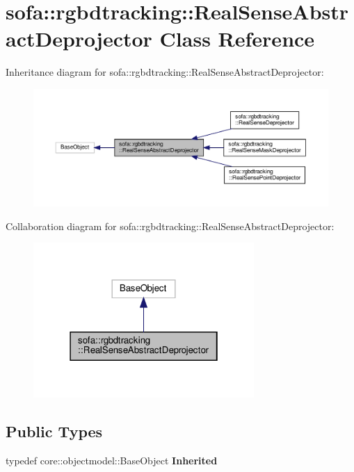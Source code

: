 \hypertarget{classsofa_1_1rgbdtracking_1_1_real_sense_abstract_deprojector}{}\section{sofa\+:\+:rgbdtracking\+:\+:Real\+Sense\+Abstract\+Deprojector Class Reference}
\label{classsofa_1_1rgbdtracking_1_1_real_sense_abstract_deprojector}


Inheritance diagram for sofa\+:\+:rgbdtracking\+:\+:Real\+Sense\+Abstract\+Deprojector\+:
\nopagebreak
\begin{figure}[H]
\begin{center}
\leavevmode
\includegraphics[width=350pt]{classsofa_1_1rgbdtracking_1_1_real_sense_abstract_deprojector__inherit__graph}
\end{center}
\end{figure}


Collaboration diagram for sofa\+:\+:rgbdtracking\+:\+:Real\+Sense\+Abstract\+Deprojector\+:
\nopagebreak
\begin{figure}[H]
\begin{center}
\leavevmode
\includegraphics[width=238pt]{classsofa_1_1rgbdtracking_1_1_real_sense_abstract_deprojector__coll__graph}
\end{center}
\end{figure}
\subsection*{Public Types}
\begin{DoxyCompactItemize}
\item 
\mbox{\label{classsofa_1_1rgbdtracking_1_1_real_sense_abstract_deprojector_a9b4cae154f99cca58b05da9c4b0084ab}} 
typedef core\+::objectmodel\+::\+Base\+Object {\bfseries Inherited}
\end{DoxyCompactItemize}
